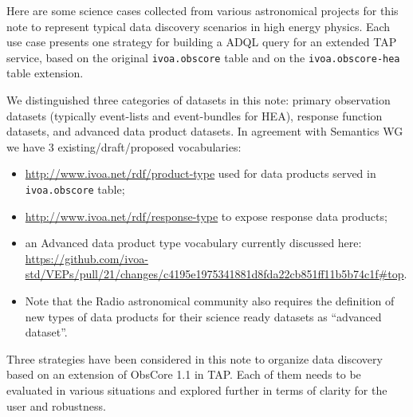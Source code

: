 Here are some science cases collected from various astronomical projects for this note to represent typical data discovery scenarios in high energy physics. 
Each use case presents one strategy for building a ADQL query for an  extended TAP service, based on the original {\tt ivoa.obscore} table and on the {\tt ivoa.obscore-hea} table extension. 

We distinguished three categories of datasets in this note: 
primary observation datasets (typically event-lists and event-bundles for \gls{HEA}), response function datasets, and advanced data product datasets.
In agreement with Semantics WG we have 3 existing/draft/proposed vocabularies: 
\begin{itemize} 
\item \url{http://www.ivoa.net/rdf/product-type} used for data products served in {\tt ivoa.obscore} table; 
\item \url{http://www.ivoa.net/rdf/response-type} to expose response data products;
\item an Advanced data product type vocabulary currently  discussed here: \\
{\small \url{https://github.com/ivoa-std/VEPs/pull/21/changes/c4195e1975341881d8fda22cb851ff11b5b74c1f#top}}.\\
\vspace{-20pt}
\item[] Note that the Radio astronomical community also requires the definition of new types of data products for their science ready datasets as ``advanced dataset''. 
\end{itemize} 

Three strategies have been considered in this note to organize data discovery based on an extension of  ObsCore 1.1 in TAP\null. Each of them needs to be evaluated in various situations and explored further in terms of clarity for the user and robustness. 

